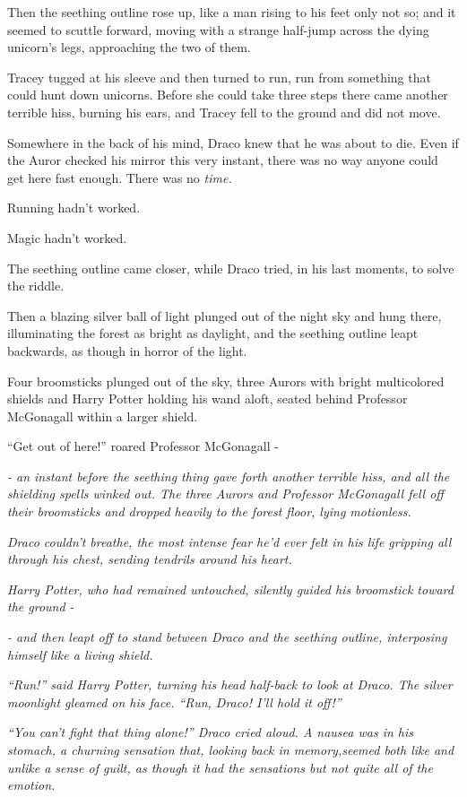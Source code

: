 Then the seething outline rose up, like a man rising to his feet only not so; and it seemed to scuttle forward, moving with a strange half-jump across the dying unicorn's legs, approaching the two of them.

Tracey tugged at his sleeve and then turned to run, run from something that could hunt down unicorns. Before she could take three steps there came another terrible hiss, burning his ears, and Tracey fell to the ground and did not move.

Somewhere in the back of his mind, Draco knew that he was about to die. Even if the Auror checked his mirror this very instant, there was no way anyone could get here fast enough. There was no \emph{time.}

Running hadn't worked.

Magic hadn't worked.

The seething outline came closer, while Draco tried, in his last moments, to solve the riddle.

Then a blazing silver ball of light plunged out of the night sky and hung there, illuminating the forest as bright as daylight, and the seething outline leapt backwards, as though in horror of the light.

Four broomsticks plunged out of the sky, three Aurors with bright multicolored shields and Harry Potter holding his wand aloft, seated behind Professor McGonagall within a larger shield.

``Get out of here!'' roared Professor McGonagall -

\emph{- an instant before the seething thing gave forth another terrible hiss, and all the shielding spells winked out. The three Aurors and Professor McGonagall fell off their broomsticks and dropped heavily to the forest floor, lying motionless.}

\emph{Draco couldn't breathe, the most intense fear he'd ever felt in his life gripping all through his chest, sending tendrils around his heart.}

\emph{Harry Potter, who had remained untouched, silently guided his broomstick toward the ground -}

\emph{- and then leapt off to stand between Draco and the seething outline, interposing himself like a living shield.}

\emph{``Run!'' said Harry Potter, turning his head half-back to look at Draco. The silver moonlight gleamed on his face. ``Run, Draco! I'll hold it off!''}

\emph{``You can't fight that thing alone!'' Draco cried aloud. A nausea was in his stomach, a churning sensation that, looking back in memory,seemed both like and unlike a sense of guilt, as though it had the sensations but not quite all of the emotion.}

